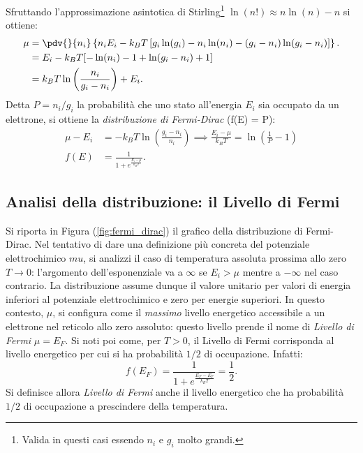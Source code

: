 \documentclass[a4paper,11pt]{report}
\begin{document}
Sfruttando l'approssimazione asintotica di Stirling\footnote{Valida in questi casi essendo $n_i$ e $g_i$ molto grandi.} $\ln(n!) \approx n\ln(n) - n$ si ottiene:
\begin{equation}
\begin{aligned}
    \mu &= \pdv{}{n_i} \left\{n_i E_i - k_B T \left[ g_i\ln(g_i)- n_i\ln(n_i) - (g_i-n_i)\ln(g_i-n_i) \right]  \right\}. \\
     &= E_i - k_B T[ -\ln(n_i) - 1 + \ln(g_i-n_i) + 1]  \\
     &=  k_B T \ln\left(\frac{n_i}{g_i-n_i}\right) + E_i.
\end{aligned}
\end{equation}
Detta $P = n_i/g_i$ la probabilità che uno stato all'energia $E_i$ sia occupato da un elettrone, si ottiene la \textit{distribuzione di Fermi-Dirac} (f(E) = P):
\begin{equation}
\begin{aligned}
    \mu - E_i &= -k_B T \ln\left(\frac{g_i -n_i}{n_i}\right) \implies \frac{E_i-\mu}{k_BT} = \ln\left( \frac{1}{P}-1 \right) \\
    f(E) &= \frac{1}{1+e^{\frac{E_i-\mu}{k_BT}}}.
\end{aligned}
\end{equation}

\subsection{Analisi della distribuzione: il Livello di Fermi}
Si riporta in Figura (\ref{fig:fermi_dirac}) il grafico della distribuzione di Fermi-Dirac. Nel tentativo di dare una definizione più concreta del potenziale elettrochimico $mu$, si analizzi il caso di temperatura assoluta prossima allo zero $T \to 0$:  l'argomento dell'esponenziale va a $\infty$ se $E_i > \mu$ mentre a $-\infty$ nel caso contrario. La distribuzione assume dunque il valore unitario per valori di energia inferiori al potenziale elettrochimico e zero per energie superiori. In questo contesto, $\mu$, si configura come il \textit{massimo} livello energetico accessibile a un elettrone nel reticolo allo zero assoluto: questo livello prende il nome di \textit{Livello di Fermi} $\mu = E_F$. Si noti poi come, per $T > 0$, il Livello di Fermi corrisponda al livello energetico per cui si ha probabilità $1/2$ di occupazione. Infatti:
\begin{equation}
	f(E_F) = \frac{1}{1+e^{\frac{E_F-E_F}{k_BT}}} = \frac{1}{2}.
\end{equation}
Si definisce allora \textit{Livello di Fermi} anche il livello energetico che ha probabilità $1/2$ di occupazione a prescindere della temperatura.
\end{document}
